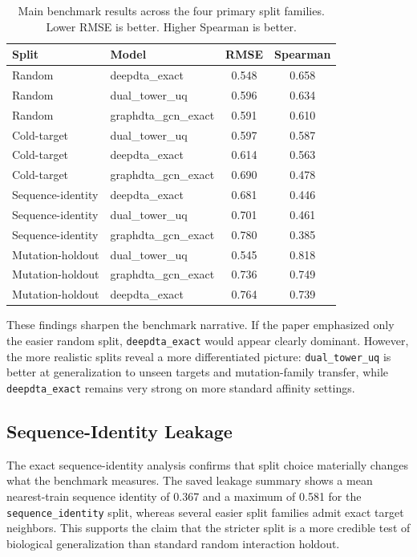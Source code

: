 \documentclass[11pt]{article}
\begin{document}
\begin{table}[H]
\centering
\caption{Main benchmark results across the four primary split families. Lower
RMSE is better. Higher Spearman is better.}
\label{tab:main-results}
\begin{tabular}{llcc}
\toprule
Split & Model & RMSE & Spearman \\
\midrule
Random & deepdta\_exact & 0.548 & 0.658 \\
Random & dual\_tower\_uq & 0.596 & 0.634 \\
Random & graphdta\_gcn\_exact & 0.591 & 0.610 \\
\midrule
Cold-target & dual\_tower\_uq & 0.597 & 0.587 \\
Cold-target & deepdta\_exact & 0.614 & 0.563 \\
Cold-target & graphdta\_gcn\_exact & 0.690 & 0.478 \\
\midrule
Sequence-identity & deepdta\_exact & 0.681 & 0.446 \\
Sequence-identity & dual\_tower\_uq & 0.701 & 0.461 \\
Sequence-identity & graphdta\_gcn\_exact & 0.780 & 0.385 \\
\midrule
Mutation-holdout & dual\_tower\_uq & 0.545 & 0.818 \\
Mutation-holdout & graphdta\_gcn\_exact & 0.736 & 0.749 \\
Mutation-holdout & deepdta\_exact & 0.764 & 0.739 \\
\bottomrule
\end{tabular}
\end{table}

These findings sharpen the benchmark narrative. If the paper emphasized only
the easier random split, \texttt{deepdta\_exact} would appear clearly dominant.
However, the more realistic splits reveal a more differentiated picture:
\texttt{dual\_tower\_uq} is better at generalization to unseen targets and
mutation-family transfer, while \texttt{deepdta\_exact} remains very strong on
more standard affinity settings.

\subsection{Sequence-Identity Leakage}

The exact sequence-identity analysis confirms that split choice materially
changes what the benchmark measures. The saved leakage summary shows a mean
nearest-train sequence identity of 0.367 and a maximum of 0.581 for the
\texttt{sequence\_identity} split, whereas several easier split families admit
exact target neighbors. This supports the claim that the stricter split is a
more credible test of biological generalization than standard random
interaction holdout.
\end{document}
